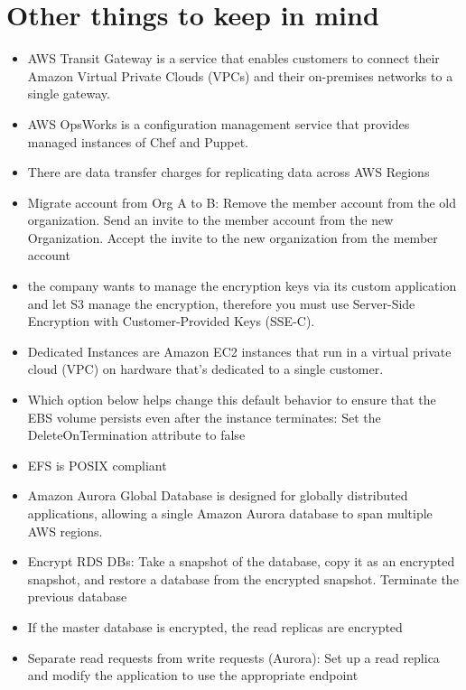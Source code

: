 \documentclass[]{scrartcl}
\begin{document}
\section{Other things to keep in mind}
\begin{itemize}
	\item AWS Transit Gateway is a service that enables customers to connect their Amazon Virtual Private Clouds (VPCs) and their on-premises networks to a single gateway.
	\item AWS OpsWorks is a configuration management service that provides managed instances of Chef and Puppet. 
	\item There are data transfer charges for replicating data across AWS Regions
	\item Migrate account from Org A to B: Remove the member account from the old organization. Send an invite to the member account from the new Organization. Accept the invite to the new organization from the member account
	\item the company wants to manage the encryption keys via its custom application and let S3 manage the encryption, therefore you must use Server-Side Encryption with Customer-Provided Keys (SSE-C).
	\item Dedicated Instances are Amazon EC2 instances that run in a virtual private cloud (VPC) on hardware that's dedicated to a single customer.
	\item Which option below helps change this default behavior to ensure that the EBS volume persists even after the instance terminates: Set the DeleteOnTermination attribute to false
	\item EFS is POSIX compliant
	\item Amazon Aurora Global Database is designed for globally distributed applications, allowing a single Amazon Aurora database to span multiple AWS regions. 
	\item Encrypt RDS DBs: Take a snapshot of the database, copy it as an encrypted snapshot, and restore a database from the encrypted snapshot. Terminate the previous database
	\item If the master database is encrypted, the read replicas are encrypted
	\item Separate read requests from write requests (Aurora): Set up a read replica and modify the application to use the appropriate endpoint
\end{itemize}
\end{document}
